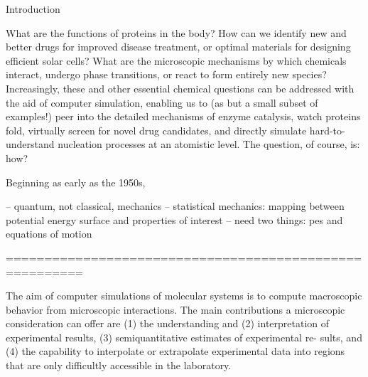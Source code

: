 \begin{chapter}{Introduction}
\label{ch:intro}


What are the functions of proteins in the body? How can we identify new and better drugs for improved
disease treatment, or optimal materials for designing efficient solar cells?
What are the microscopic mechanisms by which chemicals interact, undergo phase
transitions, or react to form entirely new species? Increasingly, these and other 
essential chemical questions can be addressed with the aid of computer
simulation, 
\cite{VanGunsteren1990,Hospital2015,Chen2015,Jiang2011,Bereau2016,Karplus2002,Maurin2016}
enabling us to (as but a small subset of examples!) peer into the detailed mechanisms of enzyme catalysis,
\cite{Warshel2003}
watch proteins fold,
\cite{Levitt1975,Lane2013,Piana2014,Perez2016}
virtually screen for novel drug candidates, 
\cite{DeVivo2016}
and directly simulate hard-to-understand nucleation processes at an atomistic level.
\cite{Kalikmanov2013}
The question, of course, is: how?

Beginning as early as the 1950s,\cite{VanGunsteren1990} 




-- quantum, not classical, mechanics
-- statistical mechanics: mapping between potential energy surface and
properties of interest
-- need two things: pes and equations of motion






========================================================



The aim of computer simulations of molecular systems is to compute macroscopic
behavior from microscopic interactions.
The main contributions a microscopic consideration can offer are (1) the
understanding and (2) interpretation of experimental results, (3)
semiquantitative estimates of experimental re- sults, and (4) the capability
to interpolate or extrapolate experimental data into regions that are only
difficultly accessible in the laboratory.
\cite{VanGunsteren1990}


\end{chapter}
